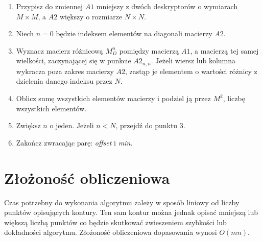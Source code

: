 \begin{enumerate} \item Przypisz do zmiennej $A1$ mniejszy z dwóch deskryptorów
    o wymiarach $M \times M$, a $A2$ większy o rozmiarze $N \times N$. \item
    Niech $n = 0$ będzie indeksem elementów na diagonali macierzy $A2$. \item
    Wyznacz macierz różnicową $M_{D}^n$ pomiędzy macierzą $A1$, a macierzą tej
    samej wielkości, zaczynającej się w punkcie $A2_{n,n}$. Jeżeli wiersz lub
    kolumna wykracza poza zakres macierzy $A2$, zastąp je elementem o wartości
    różnicy z dzielenia danego indeksu przez $N$. \item Oblicz sumę wszystkich
    elementów macierzy i podziel ją przez $M^2$, liczbę wszystkich elementów.
  \item Zwiększ $n$ o jeden. Jeżeli $n < N$, przejdź do punktu 3. \item Zakończ
    zwracając parę: \textit{offset} i \textit{min}.  \end{enumerate}

\section{Złożoność obliczeniowa}

Czas potrzebny do wykonania algorytmu zależy w sposób liniowy od liczby punktów
opisujących kontury. Ten sam kontur można jednak opisać mniejszą lub większą
liczbą punktów co będzie skutkować zwieszeniem szybkości lub dokładności
algorytmu. Złożoność obliczeniowa dopasowania wynosi $O(mn)$.
